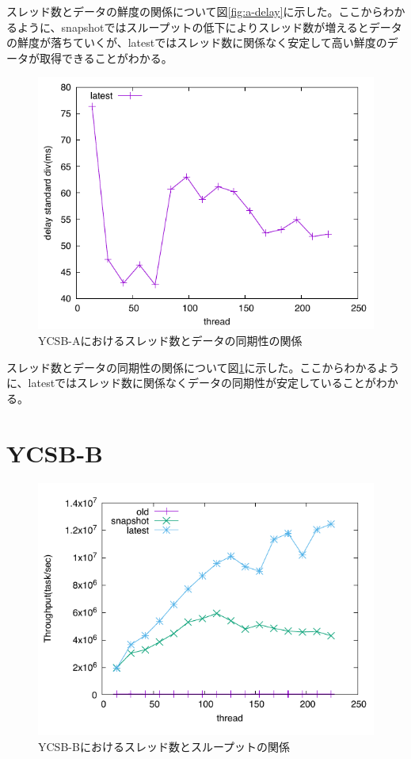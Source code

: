 \documentclass[a4paper]{jreport}	%
\begin{document}
スレッド数とデータの鮮度の関係について図\ref{fig:a-delay}に示した。ここからわかるように、snapshotではスループットの低下によりスレッド数が増えるとデータの鮮度が落ちていくが、latestではスレッド数に関係なく安定して高い鮮度のデータが取得できることがわかる。


\begin{figure}[h] 
\centering
\includegraphics[width=15cm]{ycsb-a/opposite-stddiv}
\caption{YCSB-Aにおけるスレッド数とデータの同期性の関係}
\label{fig:a-stddiv}
\end{figure}

スレッド数とデータの同期性の関係について図\ref{fig:a-stddiv}に示した。ここからわかるように、latestではスレッド数に関係なくデータの同期性が安定していることがわかる。


\section{YCSB-B}


\begin{figure}[h] 
\centering
\includegraphics[width=15cm]{ycsb-b/opposite-throughput}
\caption{YCSB-Bにおけるスレッド数とスループットの関係}
\label{fig:b-throughput}
\end{figure}
\end{document}
